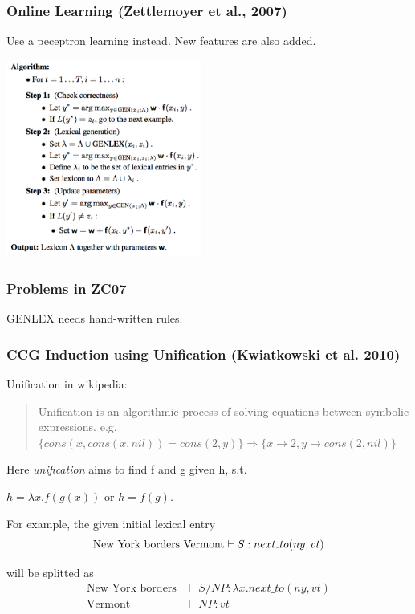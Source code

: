 \documentclass{beamer}
\begin{document}
\begin{frame}
    \frametitle{Online Learning (Zettlemoyer et al., 2007)}

    Use a peceptron learning instead. New features are also added.

    \begin{center}
        \includegraphics[height=6.5cm,width=6.42cm]{img/zc07-learn-02.png}
    \end{center}
\end{frame}

\begin{frame}
    \frametitle{Problems in ZC07}

    GENLEX needs hand-written rules.
\end{frame}

\begin{frame}
    \frametitle{CCG Induction using Unification (Kwiatkowski et al. 2010)}

    Unification in wikipedia:

    \begin{quotation}
        Unification is an algorithmic process of solving equations between symbolic expressions.
        e.g.
        $\{ cons(x,cons(x,nil)) = cons(2,y) \} \Rightarrow \{  x \to 2, y \to cons(2,nil) \}$
    \end{quotation}

    Here \emph{unification} aims to {\color[rgb]{0,0,1}find f and g given h}, s.t.
    \begin{center}
        $h = \lambda x. f(g(x))$ or $h = f(g)$.
    \end{center} \pause

    For example, the given initial lexical entry
    \[
        \text{New York borders Vermont} \vdash S: next\mathunderscore to(ny, vt)
    \]

    will be splitted as 
    \begin{align*}
        \text{New York borders} &\vdash S / NP : \lambda x . next\_to(ny, vt) \\
        \text{Vermont}          &\vdash NP : vt
    \end{align*}

\end{frame}
\end{document}

